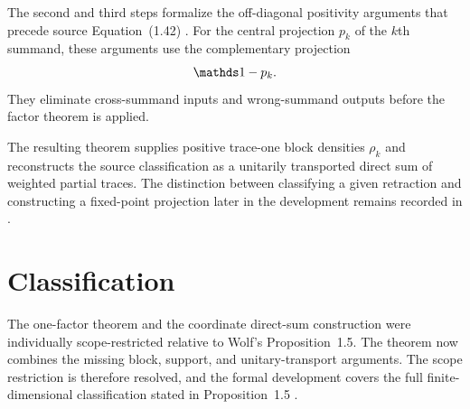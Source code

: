 \documentclass{article}
\begin{document}
The second and third steps formalize the off-diagonal positivity arguments
that precede source Equation~(1.42)
\cite[Equation~(1.42)]{Wolf2012Quantum}. For the central projection $p_k$ of
the $k$th summand, these arguments use the complementary projection
\begin{align}
    \one-p_k.
    \label{eq:wolf_prop1_5_one_factor_scope_complementary_central_projection}
\end{align}
They eliminate cross-summand inputs and wrong-summand outputs before the
factor theorem is applied.

The resulting theorem supplies positive trace-one block densities $\rho_k$
and reconstructs the source classification as a unitarily transported direct
sum of weighted partial traces. The distinction between classifying a given
retraction and constructing a fixed-point projection later in the development
remains recorded in
.

\section{Classification}

The one-factor theorem and the coordinate direct-sum construction were
individually scope-restricted relative to Wolf's Proposition~1.5. The theorem
 now
combines the missing block, support, and unitary-transport arguments. The
scope restriction is therefore resolved, and the formal development covers
the full finite-dimensional classification stated in Proposition~1.5
\cite[Proposition~1.5]{Wolf2012Quantum}.



\end{document}
